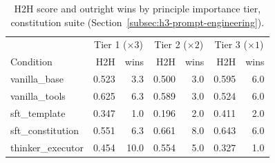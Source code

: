 \begin{table}[htbp]
  \centering
  \caption[H2H score and outright wins by importance tier]{H2H score and outright wins by principle importance tier, constitution suite (Section~\ref{subsec:h3-prompt-engineering}).}
  \label{tab:rank-tiers}
  \begin{tabular}{lrrrrrr}
    \toprule
    & \multicolumn{2}{c}{Tier 1 ($\times 3$)} & \multicolumn{2}{c}{Tier 2 ($\times 2$)} & \multicolumn{2}{c}{Tier 3 ($\times 1$)} \\
    Condition & H2H & wins & H2H & wins & H2H & wins \\
    \midrule
    vanilla\_base & 0.523 & 3.3 & 0.500 & 3.0 & 0.595 & 6.0 \\
    vanilla\_tools & 0.625 & 6.3 & 0.589 & 3.0 & 0.524 & 6.0 \\
    sft\_template & 0.347 & 1.0 & 0.196 & 2.0 & 0.411 & 2.0 \\
    sft\_constitution & 0.551 & 6.3 & 0.661 & 8.0 & 0.643 & 6.0 \\
    thinker\_executor & 0.454 & 10.0 & 0.554 & 5.0 & 0.327 & 1.0 \\
    \bottomrule
  \end{tabular}
\end{table}
